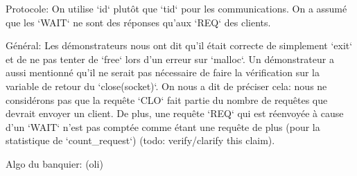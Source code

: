 \documentclass[11pt]{article}
\begin{document}
Protocole:
On utilise `id` plutôt que `tid` pour les communications.
On a assumé que les `WAIT` ne sont des réponses qu'aux `REQ` des clients.


Général:
Les démonstrateurs nous ont dit qu'il était correcte de simplement `exit` et de ne pas tenter de `free` lors d'un erreur sur `malloc`.
Un démonstrateur a aussi mentionné qu'il ne serait pas nécessaire de faire la vérification sur la variable de retour du `close(socket)`.
On nous a dit de préciser cela: nous ne considérons pas que la requête `CLO` fait partie du nombre de requêtes que devrait envoyer un client. De plus, une requête `REQ` qui est réenvoyée à cause d'un `WAIT` n'est pas comptée comme étant une requête de plus (pour la statistique de `count\_request`) (todo: verify/clarify this claim).


Algo du banquier:
(oli)
\end{document}
